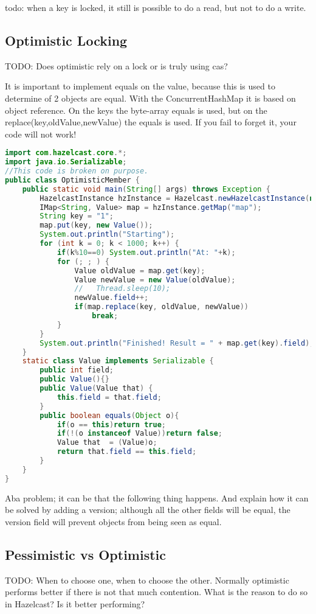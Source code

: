 todo: when a key is locked, it still is possible to do a read, but not to do a write.

\subsection{Optimistic Locking}
TODO: Does optimistic rely on a lock or is truly using cas?

It is important to implement equals on the value, because this is used to determine of 2 objects are equal. With the ConcurrentHashMap it is based on object reference. On the keys the byte-array equals is used, but on the replace(key,oldValue,newValue) the equals is used. If you fail to forget it, your code will not work!

\begin{lstlisting}[language=java]
import com.hazelcast.core.*;
import java.io.Serializable;
//This code is broken on purpose.
public class OptimisticMember {
    public static void main(String[] args) throws Exception {
        HazelcastInstance hzInstance = Hazelcast.newHazelcastInstance(null);
        IMap<String, Value> map = hzInstance.getMap("map");
        String key = "1";
        map.put(key, new Value());
        System.out.println("Starting");
        for (int k = 0; k < 1000; k++) {
            if(k%10==0) System.out.println("At: "+k);
            for (; ; ) {
                Value oldValue = map.get(key);
                Value newValue = new Value(oldValue);
                //   Thread.sleep(10);
                newValue.field++;
                if(map.replace(key, oldValue, newValue))
                    break;
            }
        }
        System.out.println("Finished! Result = " + map.get(key).field);
    }
    static class Value implements Serializable {
        public int field;
        public Value(){}
        public Value(Value that) {
            this.field = that.field;
        }
        public boolean equals(Object o){
            if(o == this)return true;
            if(!(o instanceof Value))return false;
            Value that  = (Value)o;
            return that.field == this.field;
        }
    }
}
\end{lstlisting}
Aba problem; it can be that the following thing happens. And explain how it can be solved by adding a version; although all the other fields will be equal, the version field will prevent objects from being seen as equal.

\subsection{Pessimistic vs Optimistic}
TODO: When to choose one, when to choose the other. Normally optimistic performs better if there is not that much contention. What is the reason to do so in Hazelcast? Is it better performing?

